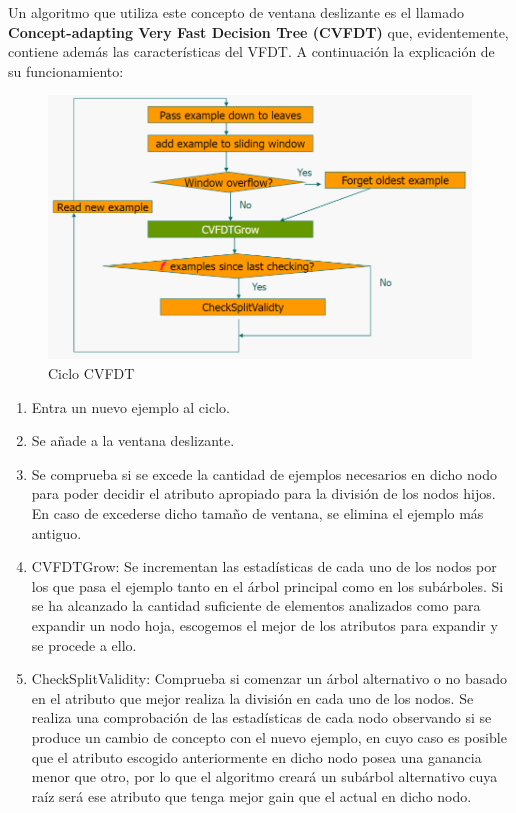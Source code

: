 Un algoritmo que utiliza este concepto de ventana deslizante es el llamado\textbf{ Concept-adapting Very Fast Decision Tree (CVFDT)} que, evidentemente, contiene además las características del VFDT. A continuación la explicación de su funcionamiento\cite{refff12}:

\begin{figure}[H]
	\centering
	\includegraphics[width=1\textwidth]{imagenes/cvfdt} 
	\caption{Ciclo CVFDT \cite{ref11}}
\end{figure}

\begin{enumerate}
	\item Entra un nuevo ejemplo al ciclo.
	\item Se añade a la ventana deslizante.
	\item Se comprueba si se excede la cantidad de ejemplos necesarios en dicho nodo para poder decidir el atributo apropiado para la división de los nodos hijos. En caso de excederse dicho tamaño de ventana, se elimina el ejemplo más antiguo.
	\item CVFDTGrow: Se incrementan las estadísticas de cada uno de los nodos por los que pasa el ejemplo tanto en el árbol principal como en los subárboles. Si se ha alcanzado la cantidad suficiente de elementos analizados como para expandir un nodo hoja, escogemos el mejor de los atributos para expandir y se procede a ello.
	\item CheckSplitValidity: Comprueba si comenzar un árbol alternativo o no basado en el atributo que mejor realiza la división en cada uno de los nodos. Se realiza una comprobación de las estadísticas de cada nodo observando si se produce un cambio de concepto con el nuevo ejemplo, en cuyo caso es posible que el atributo escogido anteriormente en dicho nodo posea una ganancia menor que otro, por lo que el algoritmo creará un subárbol alternativo cuya raíz será ese atributo que tenga mejor gain que el actual en dicho nodo.
\end{enumerate}


